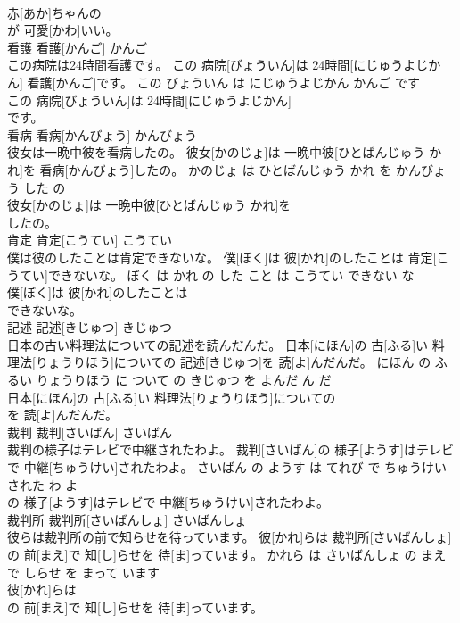 \documentclass[8pt]{extreport}
\begin{document}
\begin{CJK}{UTF8}{min}
\\	赤[あか]ちゃんの
\\	が 可愛[かわ]いい。			
\\	看護	看護[かんご]	かんご	
\\	この病院は24時間看護です。	この 病院[びょういん]は 24時間[にじゅうよじかん] 看護[かんご]です。	この びょういん は にじゅうよじかん かんご です	
\\	この 病院[びょういん]は 24時間[にじゅうよじかん]
\\	です。			
\\	看病	看病[かんびょう]	かんびょう	
\\	彼女は一晩中彼を看病したの。	彼女[かのじょ]は 一晩中彼[ひとばんじゅう かれ]を 看病[かんびょう]したの。	かのじょ は ひとばんじゅう かれ を かんびょう した の	
\\	彼女[かのじょ]は 一晩中彼[ひとばんじゅう かれ]を
\\	したの。			
\\	肯定	肯定[こうてい]	こうてい	
\\	僕は彼のしたことは肯定できないな。	僕[ぼく]は 彼[かれ]のしたことは 肯定[こうてい]できないな。	ぼく は かれ の した こと は こうてい できない な	
\\	僕[ぼく]は 彼[かれ]のしたことは
\\	できないな。			
\\	記述	記述[きじゅつ]	きじゅつ	
\\	日本の古い料理法についての記述を読んだんだ。	日本[にほん]の 古[ふる]い 料理法[りょうりほう]についての 記述[きじゅつ]を 読[よ]んだんだ。	にほん の ふるい りょうりほう に ついて の きじゅつ を よんだ ん だ	
\\	日本[にほん]の 古[ふる]い 料理法[りょうりほう]についての
\\	を 読[よ]んだんだ。			
\\	裁判	裁判[さいばん]	さいばん	
\\	裁判の様子はテレビで中継されたわよ。	裁判[さいばん]の 様子[ようす]はテレビで 中継[ちゅうけい]されたわよ。	さいばん の ようす は てれび で ちゅうけい された わ よ	
\\	の 様子[ようす]はテレビで 中継[ちゅうけい]されたわよ。			
\\	裁判所	裁判所[さいばんしょ]	さいばんしょ	
\\	彼らは裁判所の前で知らせを待っています。	彼[かれ]らは 裁判所[さいばんしょ]の 前[まえ]で 知[し]らせを 待[ま]っています。	かれら は さいばんしょ の まえ で しらせ を まって います	
\\	彼[かれ]らは
\\	の 前[まえ]で 知[し]らせを 待[ま]っています。			

\end{CJK}
\end{document}
